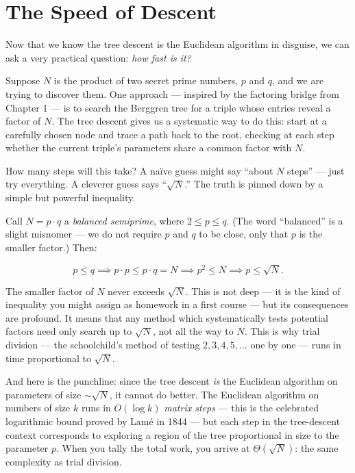 \section{The Speed of Descent}\label{ch2-the-speed-of-descent}

Now that we know the tree descent is the Euclidean algorithm in disguise, we can ask a very practical question: \emph{how fast is it?}

Suppose \(N\) is the product of two secret prime numbers, \(p\) and \(q\), and we are trying to discover them. One approach --- inspired by the factoring bridge from Chapter 1 --- is to search the Berggren tree for a triple whose entries reveal a factor of \(N\). The tree descent gives us a systematic way to do this: start at a carefully chosen node and trace a path back to the root, checking at each step whether the current triple's parameters share a common factor with \(N\).

How many steps will this take? A naïve guess might say ``about \(N\) steps'' --- just try everything. A cleverer guess says ``\(\sqrt{N}\).'' The truth is pinned down by a simple but powerful inequality.

Call \(N = p \cdot q\) a \emph{balanced semiprime}, where \(2 \le p \le q\). (The word ``balanced'' is a slight misnomer --- we do not require \(p\) and \(q\) to be close, only that \(p\) is the smaller factor.) Then:

\[
p \le q \implies p \cdot p \le p \cdot q = N \implies p^2 \le N \implies p \le \sqrt{N}.
\]

The smaller factor of \(N\) never exceeds \(\sqrt{N}\). This is not deep --- it is the kind of inequality you might assign as homework in a first course --- but its consequences are profound. It means that any method which systematically tests potential factors need only search up to \(\sqrt{N}\), not all the way to \(N\). This is why trial division --- the schoolchild's method of testing \(2, 3, 4, 5, \ldots\) one by one --- runs in time proportional to \(\sqrt{N}\).

And here is the punchline: since the tree descent \emph{is} the Euclidean algorithm on parameters of size \(\sim\!\sqrt{N}\), it cannot do better. The Euclidean algorithm on numbers of size \(k\) runs in \(O(\log k)\) \emph{matrix steps} --- this is the celebrated logarithmic bound proved by Lamé in 1844 --- but each step in the tree-descent context corresponds to exploring a region of the tree proportional in size to the parameter \(p\). When you tally the total work, you arrive at \(\Theta(\sqrt{N})\): the same complexity as trial division.

